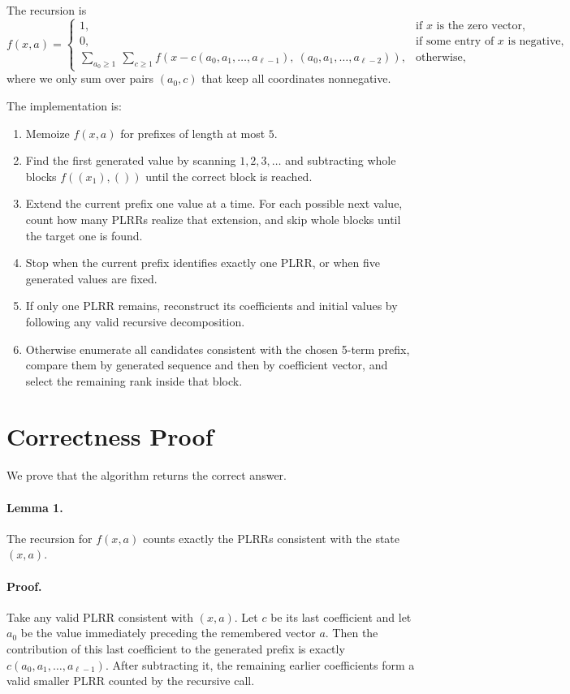 \documentclass[11pt]{article}
\begin{document}
The recursion is
\[
f(x,a)=
\begin{cases}
1, & \text{if } x \text{ is the zero vector},\\
0, & \text{if some entry of } x \text{ is negative},\\
\sum\limits_{a_0 \ge 1}\ \sum\limits_{c \ge 1}
f\!\left(x-c(a_0,a_1,\dots,a_{\ell-1}),\ (a_0,a_1,\dots,a_{\ell-2})\right),
& \text{otherwise,}
\end{cases}
\]
where we only sum over pairs $(a_0,c)$ that keep all coordinates nonnegative.

The implementation is:
\begin{enumerate}[leftmargin=*]
    \item Memoize $f(x,a)$ for prefixes of length at most $5$.
    \item Find the first generated value by scanning $1,2,3,\dots$ and subtracting whole blocks
    $f((x_1),())$ until the correct block is reached.
    \item Extend the current prefix one value at a time. For each possible next value, count how many
    PLRRs realize that extension, and skip whole blocks until the target one is found.
    \item Stop when the current prefix identifies exactly one PLRR, or when five generated values are fixed.
    \item If only one PLRR remains, reconstruct its coefficients and initial values by following any valid
    recursive decomposition.
    \item Otherwise enumerate all candidates consistent with the chosen 5-term prefix, compare them by
    generated sequence and then by coefficient vector, and select the remaining rank inside that block.
\end{enumerate}

\section*{Correctness Proof}

We prove that the algorithm returns the correct answer.

\paragraph{Lemma 1.}
The recursion for $f(x,a)$ counts exactly the PLRRs consistent with the state $(x,a)$.

\paragraph{Proof.}
Take any valid PLRR consistent with $(x,a)$. Let $c$ be its last coefficient and let $a_0$ be the value
immediately preceding the remembered vector $a$. Then the contribution of this last coefficient to the
generated prefix is exactly $c(a_0,a_1,\dots,a_{\ell-1})$. After subtracting it, the remaining earlier
coefficients form a valid smaller PLRR counted by the recursive call.
\end{document}
